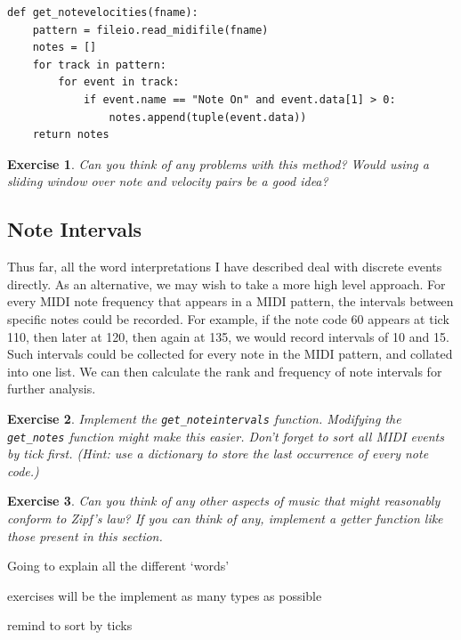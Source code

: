 \documentclass[10pt]{book}
\newtheorem{exercise}{Exercise}[chapter]
\begin{document}
\begin{verbatim}
def get_notevelocities(fname):
    pattern = fileio.read_midifile(fname)
    notes = []
    for track in pattern:
        for event in track:
            if event.name == "Note On" and event.data[1] > 0:
                notes.append(tuple(event.data))
    return notes
\end{verbatim}


\begin{exercise}
Can you think of any problems with this method? Would using a sliding window over note and velocity pairs be a good idea?
\end{exercise}



\subsection{Note Intervals}
Thus far, all the word interpretations I have described deal with discrete events directly. As an alternative, we may wish to take a more high level approach. For every MIDI note frequency that appears in a MIDI pattern, the intervals between specific notes could be recorded. For example, if the note code 60 appears at tick 110, then later at 120, then again at 135, we would record intervals of 10 and 15. Such intervals could be collected for every note in the MIDI pattern, and collated into one list. We can then calculate the rank and frequency of note intervals for further analysis.

\begin{exercise}
Implement the \texttt{get\_noteintervals} function. Modifying the \texttt{get\_notes} function might make this easier. Don't forget to sort all MIDI events by tick first. (Hint: use a dictionary to store the last occurrence of every note code.)
\end{exercise}

\begin{exercise}
Can you think of any other aspects of music that might reasonably conform to Zipf's law? If you can think of any, implement a getter function like those present in this section.
\end{exercise}






Going to explain all the different `words'

exercises will be the implement as many types as possible

remind to sort by ticks
\end{document}
